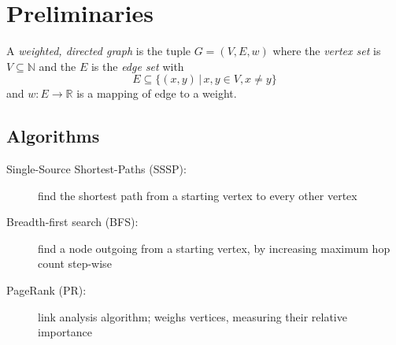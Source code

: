 \documentclass{meetings}
\begin{document}
\section{Preliminaries}
\begin{multicols}{2}
\noindent
	A \emph{weighted, directed graph} is the tuple $G=(V,E,w)$ where the \emph{vertex set} is $V\subseteq\mathbb N$ and the $E$ is the \emph{edge set} with
	\begin{equation*}
	  E\subseteq\{(x,y)\,|\, x,y\in V, x\neq y\}
	\end{equation*}
	and $w:E\rightarrow \mathbb R$ is a mapping of edge to a weight.
	
	\begin{center}
	\end{center}


	\columnbreak

	
	\subsection*{Algorithms}
	\begin{description}
		\item[Single-Source Shortest-Paths (SSSP):] find the shortest path from a starting vertex to every other vertex

		\item[Breadth-first search (BFS):] find a node outgoing from a starting vertex, by increasing maximum hop count step-wise

		\item[PageRank (PR):] link analysis algorithm; weighs vertices, measuring their relative importance
	\end{description}
\end{multicols}
\end{document}
